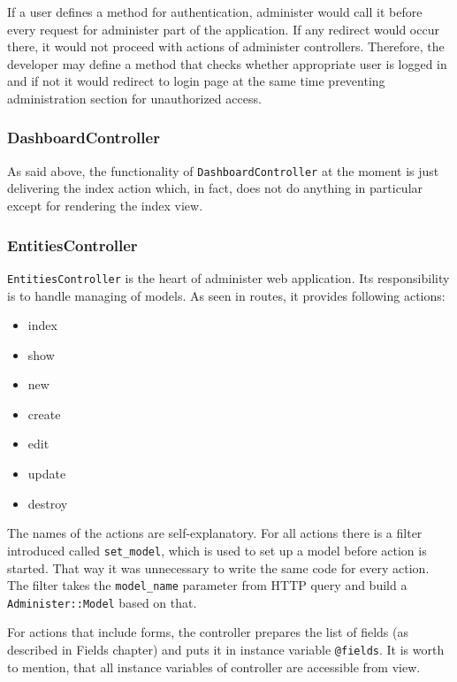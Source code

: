         If a user defines a method for authentication, administer would call it before every request
        for administer part of the application. If any redirect would occur there, it would not proceed
        with actions of administer controllers. Therefore, the developer may define a method that checks 
        whether appropriate user is logged in and if not it would redirect to login page at the same time
        preventing administration section for unauthorized access.
      
      \subsubsection{DashboardController}
       As said above, the functionality of \texttt{DashboardController} at the moment is just delivering
       the index action which, in fact, does not do anything in particular except for rendering the index
       view.
      \subsubsection{EntitiesController}
        \texttt{EntitiesController} is the heart of administer web application. Its responsibility 
        is to handle managing of models. As seen in routes, it provides following actions:
        
        \begin{itemize}
          \item index
          \item show
          \item new
          \item create
          \item edit
          \item update
          \item destroy
        \end{itemize}
        
        The names of the actions are self-explanatory. For all actions there is a filter introduced
        called \texttt{set\_model}, which is used to set up a model before action is started.
        That way it was unnecessary to write the same code for every action.
        The filter takes the \texttt{model\_name} parameter from HTTP query and build a 
        \texttt{Administer::Model} based on that.
        
        For actions that include forms, the controller prepares the list of fields (as described in Fields chapter)
        and puts it in instance variable \texttt{@fields}. It is worth to mention, that all instance variables
        of controller are accessible from view.

